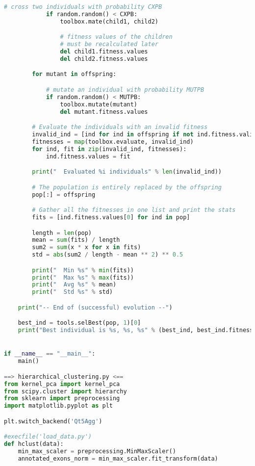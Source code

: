 \begin{lstlisting}[columns=fullflexible,language=Python]
            # cross two individuals with probability CXPB
            if random.random() < CXPB:
                toolbox.mate(child1, child2)

                # fitness values of the children
                # must be recalculated later
                del child1.fitness.values
                del child2.fitness.values

        for mutant in offspring:

            # mutate an individual with probability MUTPB
            if random.random() < MUTPB:
                toolbox.mutate(mutant)
                del mutant.fitness.values

        # Evaluate the individuals with an invalid fitness
        invalid_ind = [ind for ind in offspring if not ind.fitness.valid]
        fitnesses = map(toolbox.evaluate, invalid_ind)
        for ind, fit in zip(invalid_ind, fitnesses):
            ind.fitness.values = fit

        print("  Evaluated %i individuals" % len(invalid_ind))

        # The population is entirely replaced by the offspring
        pop[:] = offspring

        # Gather all the fitnesses in one list and print the stats
        fits = [ind.fitness.values[0] for ind in pop]

        length = len(pop)
        mean = sum(fits) / length
        sum2 = sum(x * x for x in fits)
        std = abs(sum2 / length - mean ** 2) ** 0.5

        print("  Min %s" % min(fits))
        print("  Max %s" % max(fits))
        print("  Avg %s" % mean)
        print("  Std %s" % std)

    print("-- End of (successful) evolution --")

    best_ind = tools.selBest(pop, 1)[0]
    print("Best individual is %s, %s, %s" % (best_ind, best_ind.fitness.values, sum(best_ind)))


if __name__ == "__main__":
    main()

==> hierarchical_clustering.py <==
from kernel_pca import kernel_pca
from scipy.cluster import hierarchy
from sklearn import preprocessing
import matplotlib.pyplot as plt

plt.switch_backend('Qt5Agg')

#execfile('load_data.py')
def hclust(data):
    min_max_scaler = preprocessing.MinMaxScaler()
    annotated_exons_norm = min_max_scaler.fit_transform(data)


\end{lstlisting}

